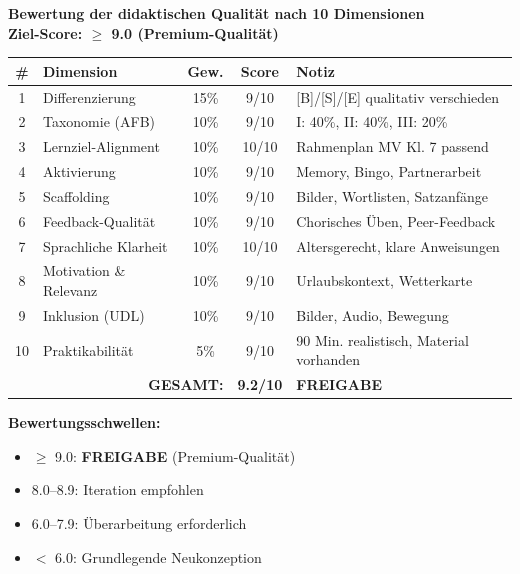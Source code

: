 \documentclass[11pt,a4paper]{article}
\begin{document}
\begin{scorebox}
\textbf{Bewertung der didaktischen Qualität nach 10 Dimensionen}\\
\textbf{Ziel-Score: $\geq$ 9.0 (Premium-Qualität)}

\vspace{1em}
\begin{tabular}{|c|l|c|c|p{4.5cm}|}
\hline
\textbf{\#} & \textbf{Dimension} & \textbf{Gew.} & \textbf{Score} & \textbf{Notiz} \\
\hline
1 & Differenzierung & 15\% & 9/10 & [B]/[S]/[E] qualitativ verschieden \\
\hline
2 & Taxonomie (AFB) & 10\% & 9/10 & I: 40\%, II: 40\%, III: 20\% \\
\hline
3 & Lernziel-Alignment & 10\% & 10/10 & Rahmenplan MV Kl. 7 passend \\
\hline
4 & Aktivierung & 10\% & 9/10 & Memory, Bingo, Partnerarbeit \\
\hline
5 & Scaffolding & 10\% & 9/10 & Bilder, Wortlisten, Satzanfänge \\
\hline
6 & Feedback-Qualität & 10\% & 9/10 & Chorisches Üben, Peer-Feedback \\
\hline
7 & Sprachliche Klarheit & 10\% & 10/10 & Altersgerecht, klare Anweisungen \\
\hline
8 & Motivation \& Relevanz & 10\% & 9/10 & Urlaubskontext, Wetterkarte \\
\hline
9 & Inklusion (UDL) & 10\% & 9/10 & Bilder, Audio, Bewegung \\
\hline
10 & Praktikabilität & 5\% & 9/10 & 90 Min. realistisch, Material vorhanden \\
\hline
\multicolumn{3}{|r|}{\textbf{GESAMT:}} & \textbf{9.2/10} & \textcolor{successgreen}{\textbf{FREIGABE}} \\
\hline
\end{tabular}

\vspace{1em}
\textbf{Bewertungsschwellen:}
\begin{itemize}
    \item[$\boxtimes$] \textcolor{successgreen}{$\geq$ 9.0: \textbf{FREIGABE} (Premium-Qualität)}
    \item[$\Box$] \textcolor{warningorange}{8.0--8.9: Iteration empfohlen}
    \item[$\Box$] 6.0--7.9: Überarbeitung erforderlich
    \item[$\Box$] $<$ 6.0: Grundlegende Neukonzeption
\end{itemize}
\end{scorebox}
\end{document}
